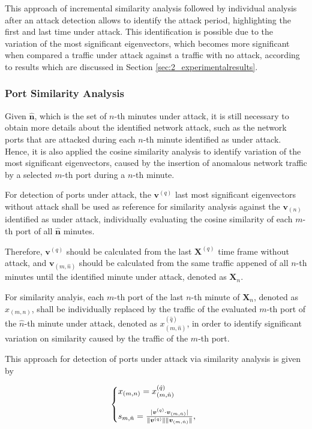 This approach of incremental similarity analysis followed by individual analysis after an attack detection allows to identify the attack period, highlighting the first and last time under attack. This identification is possible due to the variation of the most significant eigenvectors, which becomes more significant when compared a traffic under attack against a traffic with no attack, according to results which are discussed in Section \ref{sec:2_experimentalresults}.

\subsubsection{Port Similarity Analysis}
\label{sec:2_prop_PortSimilarityAnalysis}

Given $\boldsymbol{\hat{n}}$, which is the set of $n$-th minutes under attack, it is still necessary to obtain more details about the identified network attack, such as the network ports that are attacked during each $n$-th minute identified as under attack. Hence, it is also applied the cosine similarity analysis to identify variation of the most significant eigenvectors, caused by the insertion of anomalous network traffic by a selected $m$-th port during a $n$-th minute. 

For detection of ports under attack, the $\boldsymbol{v}^{(q)}$ last most significant eigenvectors without attack shall be used as reference for similarity analysis against the $\boldsymbol{v}_{(n)}$ identified as under attack, individually evaluating the cosine similarity of each $m$-th port of all $\boldsymbol{\hat{n}}$ minutes.

Therefore, $\boldsymbol{v}^{(q)}$ should be calculated from the last $\boldsymbol{X}^{(q)}$ time frame without attack, and $\boldsymbol{v}_{(m,\hat{n})}$ should be calculated from the same traffic appened of all $n$-th minutes until the identified minute under attack, denoted as $\boldsymbol{X}_n$. 

For similarity analyis, each $m$-th port of the last $n$-th minute of $\boldsymbol{X}_n$, denoted as $x_{(m,n)}$, shall be individually replaced by the traffic of the evaluated $m$-th port of the $\hat{n}$-th minute under attack, denoted as $x^{(\hat{q})}_{(m,\hat{n})}$, in order to identify significant variation on similarity caused by the traffic of the $m$-th port. 

This approach for detection of ports under attack via similarity analysis is given by

\begin{equation}\label{eq:eq15}
  \left\{
  \begin{array}{@{}ll@{}}
    x_{(m,n)} = x^{(\hat{q})}_{(m,\hat{n})} \\
    \\
    s_{m,\hat{n}} = \frac{\abs{\boldsymbol{v}^{(q)} \cdot \boldsymbol{v}_{(m,\hat{n})}}}{\norm{\boldsymbol{v}^{(q)}}\norm{\boldsymbol{v}_{(m,\hat{n})}}},
  \end{array}\right.
\end{equation}

